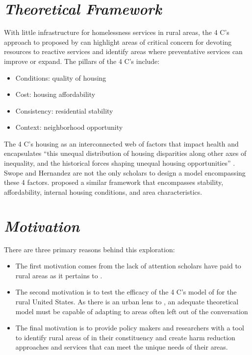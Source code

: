 \section{\textit{Theoretical Framework}}
With little infrastructure for homelessness services in rural areas, the 4 C’s approach to \hs proposed by \citet{swope_housing_2020} can highlight areas of critical concern for devoting resources to reactive services and identify areas where preventative services can improve or expand. The pillars of the 4 C's include:
\begin{itemize}
    \item{Conditions: quality of housing}
    \item{Cost: housing affordability}
    \item{Consistency: residential stability}
    \item{Context: neighborhood opportunity }
\end{itemize}
The 4 C’s housing as an interconnected web of factors that impact health and encapsulates “this unequal distribution of housing disparities along other axes of inequality, and the historical forces shaping unequal housing opportunities” \citep[1]{hernandez_housing_2019}. Swope and Hernandez are not the only scholars to design a model encompassing these 4 factors. \citet{metzger_fair_2017} proposed a similar framework that encompasses stability, affordability, internal housing conditions, and area characteristics. 



\section{\textit{Motivation}}
There are three primary reasons behind this exploration:
\begin{itemize}
    \item{The first motivation comes from the lack of attention scholars have paid to rural areas as it pertains to \hs. }
    \item{The second motivation is to test the efficacy of the 4 C's model of \hs for the rural United States. As there is an urban lens to \hs, an adequate theoretical model must be capable of adapting to areas often left out of the conversation}
    \item{The final motivation is to provide policy makers and researchers with a tool to identify rural areas of \hs in their constituency and create harm reduction approaches and services that can meet the unique needs of their areas.}

\end{itemize}


